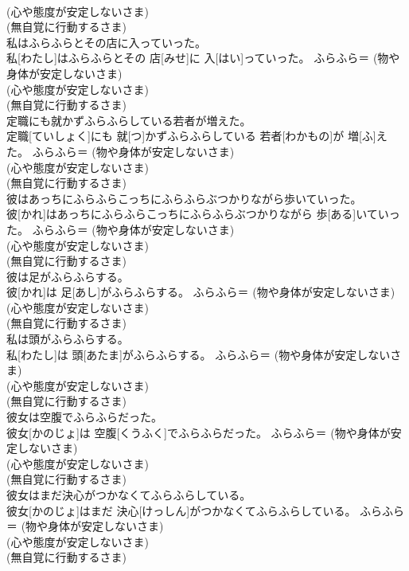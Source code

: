 \documentclass[8pt]{extreport}
\begin{document}
\begin{CJK}{UTF8}{min}
{\\	(心や態度が安定しないさま) 
\\	(無自覚に行動するさま) 
\\	私はふらふらとその店に入っていった。	
\\	私[わたし]はふらふらとその 店[みせ]に 入[はい]っていった。	ふらふら＝ (物や身体が安定しないさま) 
\\	(心や態度が安定しないさま) 
\\	(無自覚に行動するさま) 
\\	定職にも就かずふらふらしている若者が増えた。	
\\	定職[ていしょく]にも 就[つ]かずふらふらしている 若者[わかもの]が 増[ふ]えた。	ふらふら＝ (物や身体が安定しないさま) 
\\	(心や態度が安定しないさま) 
\\	(無自覚に行動するさま) 
\\	彼はあっちにふらふらこっちにふらふらぶつかりながら歩いていった。	
\\	彼[かれ]はあっちにふらふらこっちにふらふらぶつかりながら 歩[ある]いていった。	ふらふら＝ (物や身体が安定しないさま) 
\\	(心や態度が安定しないさま) 
\\	(無自覚に行動するさま) 
\\	彼は足がふらふらする。	
\\	彼[かれ]は 足[あし]がふらふらする。	ふらふら＝ (物や身体が安定しないさま) 
\\	(心や態度が安定しないさま) 
\\	(無自覚に行動するさま) 
\\	私は頭がふらふらする。	
\\	私[わたし]は 頭[あたま]がふらふらする。	ふらふら＝ (物や身体が安定しないさま) 
\\	(心や態度が安定しないさま) 
\\	(無自覚に行動するさま) 
\\	彼女は空腹でふらふらだった。	
\\	彼女[かのじょ]は 空腹[くうふく]でふらふらだった。	ふらふら＝ (物や身体が安定しないさま) 
\\	(心や態度が安定しないさま) 
\\	(無自覚に行動するさま) 
\\	彼女はまだ決心がつかなくてふらふらしている。	
\\	彼女[かのじょ]はまだ 決心[けっしん]がつかなくてふらふらしている。	ふらふら＝ (物や身体が安定しないさま) 
\\	(心や態度が安定しないさま) 
\\	(無自覚に行動するさま) 
}
\end{CJK}
\end{document}
